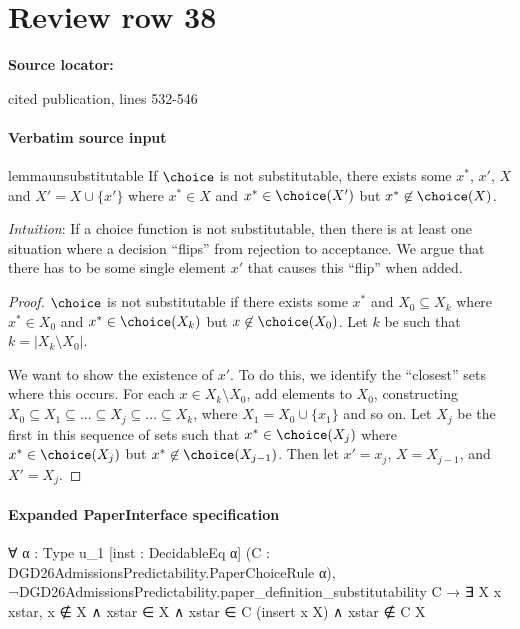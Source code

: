 \documentclass[10pt]{article}
\begin{document}
\section*{Review row 38}
\textbf{Source locator:} {\footnotesize\raggedright cited publication, lines 532-\allowbreak{}546\par}
\paragraph{Verbatim source input}
\begin{ReviewVerbatim}
\begin{restatable}{lemma}{unsubstitutable}
\label{lem:unsubstitutable}
If $\choice$ is not substitutable, there exists some $x^*$, $x'$, $X$ and $X' = X \cup \{x'\}$ where $x^* \in X$ and $x^* \in \choice(X')$ but $x^* \not\in \choice(X)$.
\end{restatable}

\textit{Intuition}:
If a choice function is not substitutable, then there is at least one situation where a decision ``flips'' from rejection to acceptance.
We argue that there has to be some single element $x'$ that causes this ``flip'' when added.

\begin{proof}
$\choice$ is not substitutable if there exists some  $x^*$ and $X_0 \subseteq X_k$ where $x^* \in X_0$ and $x^* \in \choice(X_k)$ but $x \not\in \choice(X_0)$.
Let $k$ be such that $k = |X_k \setminus X_0|$.%

We want to show the existence of $x'$. To do this, we identify the ``closest'' sets where this occurs. For each $x \in X_k \setminus X_0$, add elements to $X_0$, constructing $X_0 \subseteq X_1 \subseteq ... \subseteq X_j \subseteq ... \subseteq X_k$, where $X_1 = X_0 \cup \{x_1\}$ and so on. Let $X_j$ be the first in this sequence of sets such that $x^* \in \choice(X_j)$ where $x^* \in \choice(X_j)$ but $x^* \not\in \choice(X_{j-1})$. Then let $x' = x_j$, $X = X_{j-1}$, and $X' = X_j$.
\end{proof}
\end{ReviewVerbatim}


\paragraph{Expanded PaperInterface specification}
\begin{ReviewVerbatim}
∀ {α : Type u_1} [inst : DecidableEq α] (C : DGD26AdmissionsPredictability.PaperChoiceRule α),
  ¬DGD26AdmissionsPredictability.paper_definition_substitutability C →
    ∃ X x xstar, x ∉ X ∧ xstar ∈ X ∧ xstar ∈ C (insert x X) ∧ xstar ∉ C X
\end{ReviewVerbatim}
\end{document}
